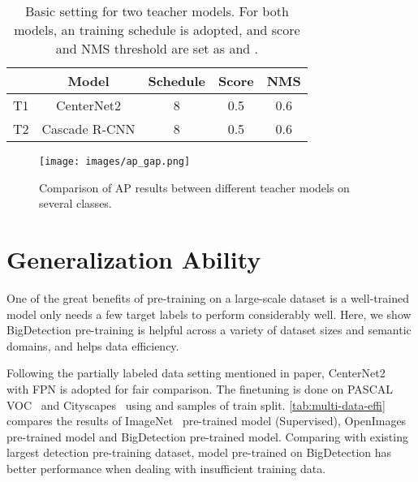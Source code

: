\documentclass[10pt,twocolumn,letterpaper]{article}
\begin{document}
\begin{table}[ht]
    \begin{center}
        \begin{tabular}{c|cccc}
            \toprule
             & Model & Schedule & Score & NMS \\
            \midrule
            T1 & CenterNet2 & 8 & 0.5 & 0.6 \\
            T2 & Cascade R-CNN & 8 & 0.5 & 0.6 \\
            \bottomrule
        \end{tabular}
    \end{center}
    \caption{Basic setting for two teacher models. For both models, an  training schedule is adopted, and score and NMS threshold are set as  and .}
    \label{tab:multi-teacher}
\end{table} \begin{figure}[ht]
  \centering
  \texttt{[image: images/ap\_gap.png]}
  \caption{Comparison of AP results between different teacher models on several classes.}
  \label{fig:ap_gap}
\end{figure} 
 
\section{Generalization Ability}
\label{sec:general}

One of the great benefits of pre-training on a large-scale dataset is a well-trained model only needs a few target labels to perform considerably well. Here, we show BigDetection pre-training is helpful across a variety of dataset sizes and semantic domains, and helps data efficiency.

Following the partially labeled data setting mentioned in paper, CenterNet2~\cite{zhou2021probabilistic} with FPN is adopted for fair comparison. The finetuning is done on PASCAL VOC~\cite{everingham2015pascal} and Cityscapes~\cite{cordts2016cityscapes} using  and  samples of train split. 
\cref{tab:multi-data-effi} compares the results of ImageNet~\cite{deng2009imagenet} pre-trained model (Supervised), OpenImages~\cite{kuznetsova2020open} pre-trained model and BigDetection pre-trained model. 
Comparing with existing largest detection pre-training dataset, model pre-trained on BigDetection has better performance when dealing with insufficient training data. 
\end{document}
